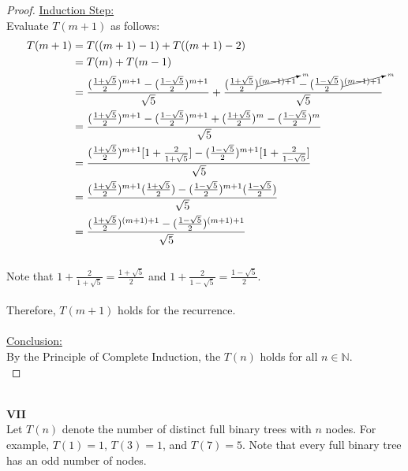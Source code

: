 \documentclass[12pt]{article}
\begin{document}
\begin{proof}
    \underline{Induction Step:} \\
    Evaluate $T(m + 1)$ as follows:
    \large
    \begin{equation*}
        \begin{aligned}
            T(m + 1) &= T((m + 1) - 1) + T((m + 1) - 2) \\
            &= T(m) + T(m - 1) \\
            &= \frac{(\frac{1 + \sqrt{5}}{2})^{m + 1} - (\frac{1 - \sqrt{5}}{2})^{m + 1}}{\sqrt{5}} + \frac{(\frac{1 + \sqrt{5}}{2})^{\cancelto{m}{(m - 1) + 1}} - (\frac{1 - \sqrt{5}}{2})^{\cancelto{m}{(m - 1) + 1}}}{\sqrt{5}} \\
            &= \frac{(\frac{1 + \sqrt{5}}{2})^{m + 1} - (\frac{1 - \sqrt{5}}{2})^{m + 1} + (\frac{1 + \sqrt{5}}{2})^m - (\frac{1 - \sqrt{5}}{2})^m}{\sqrt{5}} \\
            &= \frac{(\frac{1 + \sqrt{5}}{2})^{m + 1} [1 + \frac{2}{1 + \sqrt{5}}] - (\frac{1 - \sqrt{5}}{2})^{m + 1} [1 + \frac{2}{1 - \sqrt{5}}]}{\sqrt{5}} \\
            &= \frac{(\frac{1 + \sqrt{5}}{2})^{m + 1} (\frac{1 + \sqrt{5}}{2}) - (\frac{1 - \sqrt{5}}{2})^{m + 1} (\frac{1 - \sqrt{5}}{2})}{\sqrt{5}} \\
            &= \frac{(\frac{1 + \sqrt{5}}{2})^{(m + 1) + 1} - (\frac{1 - \sqrt{5}}{2})^{(m + 1) + 1}}{\sqrt{5}} \\
        \end{aligned}
    \end{equation*}
    \normalsize
    \\
    Note that $1 + \frac{2}{1 + \sqrt{5}} = \frac{1 + \sqrt{5}}{2}$ and $1 + \frac{2}{1 - \sqrt{5}} = \frac{1 - \sqrt{5}}{2}$. \\
    \\
    Therefore, $T(m + 1)$ holds for the recurrence. \\
    \\
    \underline{Conclusion:} \\
    By the Principle of Complete Induction, the $T(n)$ holds for all $n \in \mathbb{N}$. \\
\end{proof}
\leavevmode\\
\textbf{VII} \\
Let $T(n)$ denote the number of distinct full binary trees with $n$ nodes. For example, $T(1) = 1$, $T(3) = 1$, and $T(7) = 5$. Note that every full binary tree has an odd number of nodes. \\
\\
\end{document}
